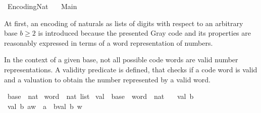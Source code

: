 %
\begin{isabellebody}%
%
%
\isadelimdocument
%
\endisadelimdocument
%
\isatagdocument
%
\isamarkuptrue%
%
\endisatagdocument
{\isafolddocument}%
%
\isadelimdocument
%
\endisadelimdocument
%
\isadelimtheory
%
\endisadelimtheory
%
\isatagtheory
{}\isamarkupfalse%
\ Encoding{\isacharunderscore}{\kern0pt}Nat\isanewline
\ \ \ Main\isanewline
{}%
\endisatagtheory
{\isafoldtheory}%
%
\isadelimtheory
%
\endisadelimtheory
%
\begin{isamarkuptext}%
At first, an encoding of naturals as lists of digits with respect to
  an arbitrary base $b \geq 2$ is introduced because the presented
  Gray code and its properties are reasonably expressed in terms of
  a word representation of numbers.%
\end{isamarkuptext}\isamarkuptrue%
%
\isadelimdocument
%
\endisadelimdocument
%
\isatagdocument
%
\isamarkuptrue%
%
\endisatagdocument
{\isafolddocument}%
%
\isadelimdocument
%
\endisadelimdocument
%
\begin{isamarkuptext}%
In the context of a given base, not all possible code words are valid
  number representations.
A validity predicate is defined, that checks if a code word is valid
  and a valuation to obtain the number represented by a valid word.%
\end{isamarkuptext}\isamarkuptrue%
\isamarkupfalse%
\ base\ {\isacharequal}{\kern0pt}\ nat\isanewline
\isanewline
{}\isamarkupfalse%
\ word\ {\isacharequal}{\kern0pt}\ {\isachardoublequoteopen}nat\ list{\isachardoublequoteclose}\isanewline
\isanewline
{}\isamarkupfalse%
\ val\ {\isacharcolon}{\kern0pt}{\isacharcolon}{\kern0pt}\ {\isachardoublequoteopen}base\ {\isasymRightarrow}\ word\ {\isasymRightarrow}\ nat{\isachardoublequoteclose}\ \isanewline
\ \ {\isachardoublequoteopen}val\ b\ {\isacharbrackleft}{\kern0pt}{\isacharbrackright}{\kern0pt}\ {\isacharequal}{\kern0pt}\ {}{\isachardoublequoteclose}\isanewline
{\isacharbar}{\kern0pt}\ {\isachardoublequoteopen}val\ b\ {\isacharparenleft}{\kern0pt}a{\isacharhash}{\kern0pt}w{\isacharparenright}{\kern0pt}\ {\isacharequal}{\kern0pt}\ a\ {\isacharplus}{\kern0pt}\ b{\isacharasterisk}{\kern0pt}val\ b\ w{\isachardoublequoteclose}\isanewline

\end{isabellebody}
